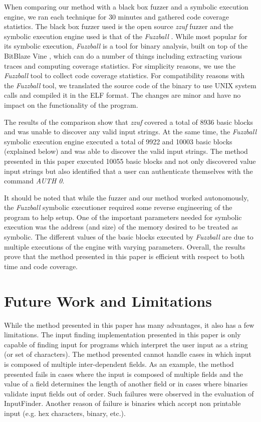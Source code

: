 \documentclass{sig-alternate-05-2015}
\def \tool {InputFinder}
\begin{document}
When comparing our method with a black box fuzzer and a symbolic execution engine, we ran each technique for 30 minutes and gathered code coverage statistics.
The black box fuzzer used is the open source \textit{zzuf} fuzzer and the symbolic execution engine used is that of the \textit{Fuzzball} \cite{zzuf, fuzzball}.
While most popular for its symbolic execution, \textit{Fuzzball} is a tool for binary analysis, built on top of the BitBlaze Vine \cite{bitblaze}, which can do a number of things including extracting various traces and computing coverage statistics.
For simplicity reasons, we use the \textit{Fuzzball} tool to collect code coverage statistics.
For compatibility reasons with the \textit{Fuzzball} tool, we translated the source code of the binary to use UNIX system calls and compiled it in the ELF format.
The changes are minor and have no impact on the functionality of the program.

The results of the comparison show that \textit{zzuf} covered a total of 8936 basic blocks and was unable to discover any valid input strings.
At the same time, the \textit{Fuzzball} symbolic execution engine executed a total of 9922 and 10003 basic blocks (explained below) and was able to discover the valid input strings.
The method presented in this paper executed 10055 basic blocks and not only discovered value input strings but also identified that a user can authenticate themselves with the command \textit{AUTH 0}.

It should be noted that while the fuzzer and our method worked autonomously, the \textit{Fuzzball} symbolic executioner required some reverse engineering of the program to help setup.
One of the important parameters needed for symbolic execution was the address (and size) of the memory desired to be treated as symbolic.
The different values of the basic blocks executed by \textit{Fuzzball} are due to multiple executions of the engine with varying parameters.
Overall, the results prove that the method presented in this paper is efficient with respect to both time and code coverage.

\section{Future Work and Limitations} \label{futurework}
While the method presented in this paper has many advantages, it also has a few limitations.
The input finding implementation presented in this paper is only capable of finding input for programs which interpret the user input as a string (or set of characters).
The method presented cannot handle cases in which input is composed of multiple inter-dependent fields. 
As an example, the method presented fails in cases where the input is composed of multiple fields and the value of a field determines the length of another field or in cases where binaries validate input fields out of order.
Such failures were observed in the evaluation of \tool{}. 
Another reason of failure is binaries which accept non printable input (e.g. hex characters, binary, etc.).
\end{document}
